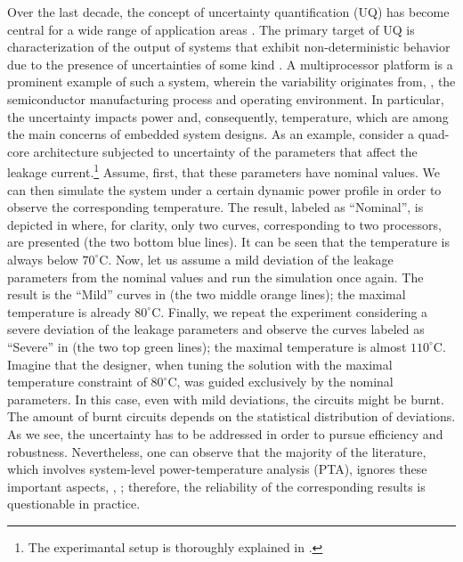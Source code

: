 Over the last decade, the concept of uncertainty quantification (UQ) has become central for a wide range of application areas \cite{xiu2010}. The primary target of UQ is characterization of the output of systems that exhibit non-deterministic behavior due to the presence of uncertainties of some kind \cite{eldred2009}. A multiprocessor platform is a prominent example of such a system, wherein the variability originates from, \eg, the semiconductor manufacturing process and operating environment. In particular, the uncertainty impacts power and, consequently, temperature, which are among the main concerns of embedded system designs. As an example, consider a quad-core architecture subjected to uncertainty of the parameters that affect the leakage current.\footnote{The experimantal setup is thoroughly explained in .} Assume, first, that these parameters have nominal values. We can then simulate the system under a certain dynamic power profile in order to observe the corresponding temperature. The result, labeled as ``Nominal'', is depicted in  where, for clarity, only two curves, corresponding to two processors, are presented (the two bottom blue lines). It can be seen that the temperature is always below $70^{\circ}$C. Now, let us assume a mild deviation of the leakage parameters from the nominal values and run the simulation once again. The result is the ``Mild'' curves in  (the two middle orange lines); the maximal temperature is already $80^{\circ}$C. Finally, we repeat the experiment considering a severe deviation of the leakage parameters and observe the curves labeled as ``Severe'' in  (the two top green lines); the maximal temperature is almost $110^{\circ}$C. Imagine that the designer, when tuning the solution with the maximal temperature constraint of $80^\circ$C, was guided exclusively by the nominal parameters. In this case, even with mild deviations, the circuits might be burnt. The amount of burnt circuits depends on the statistical distribution of deviations. As we see, the uncertainty has to be addressed in order to pursue efficiency and robustness. Nevertheless, one can observe that the majority of the literature, which involves system-level power-temperature analysis (PTA), ignores these important aspects, \eg, \cite{rao2009, rai2011, thiele2011, ukhov2012}; therefore, the reliability of the corresponding results is questionable in practice.


